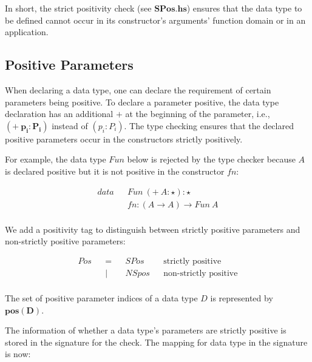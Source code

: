 In short, the strict positivity check (see $\boldsymbol{SPos.hs}$) ensures that the data type to be defined cannot occur in its constructor's arguments' function domain or in an application.

\subsection{Positive Parameters}

When declaring a data type, one can declare the requirement of certain parameters being positive. To declare a parameter positive, the data type declaration has an additional $\boldsymbol{+}$ at the beginning of the parameter, i.e., $\boldsymbol{(+ \: p_i:P_i)}$ instead of $(p_i : P_i)$. The type checking ensures that the declared positive parameters occur in the constructors strictly positively.

For example, the data type $Fun$ below is rejected by the type checker because $A$ is declared positive but it is not positive in the constructor $fn$:

\begin{figure}[H]
  \begin{equation*}
    \begin{aligned}
      data &  & Fun \: (+ \: A : \star) : \star \\
           &  & fn : (A \to A ) \to Fun \: A    \\
    \end{aligned}
  \end{equation*}
\end{figure}


We add a positivity tag to distinguish between strictly positive parameters and non-strictly positive parameters:

\begin{figure}[H]
  \begin{equation*}
    \begin{aligned}
      Pos &  & = &  & SPos  &  & \textrm{strictly positive}     \\
          &  & | &  & NSpos &  & \textrm{non-strictly positive} \\
    \end{aligned}
  \end{equation*}
\end{figure}

The set of positive parameter indices of a data type $D$ is represented by $\boldsymbol{pos(D)}$.

The information of whether a data type's parameters are strictly positive is stored in the signature for the check. The mapping for data type in the signature is now:

